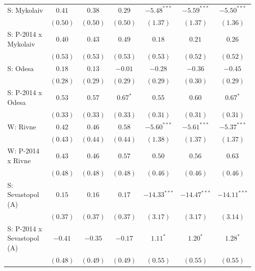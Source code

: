 \begin{table}
\begin{center}
\begin{small}
\begin{tabular}{l c c c c c c}
S: Mykolaiv                 & $0.41$        & $0.38$       & $0.29$        & $-5.48^{***}$  & $-5.59^{***}$  & $-5.50^{***}$  \\
                            & $(0.50)$      & $(0.50)$     & $(0.50)$      & $(1.37)$       & $(1.37)$       & $(1.36)$       \\
S: P-2014 x Mykolaiv        & $0.40$        & $0.43$       & $0.49$        & $0.18$         & $0.21$         & $0.26$         \\
                            & $(0.53)$      & $(0.53)$     & $(0.53)$      & $(0.53)$       & $(0.52)$       & $(0.52)$       \\
S: Odesa                    & $0.18$        & $0.13$       & $-0.01$       & $-0.28$        & $-0.36$        & $-0.45$        \\
                            & $(0.28)$      & $(0.29)$     & $(0.29)$      & $(0.29)$       & $(0.30)$       & $(0.29)$       \\
S: P-2014 x Odesa           & $0.53$        & $0.57$       & $0.67^{*}$    & $0.55$         & $0.60$         & $0.67^{*}$     \\
                            & $(0.33)$      & $(0.33)$     & $(0.33)$      & $(0.31)$       & $(0.31)$       & $(0.31)$       \\
W: Rivne                    & $0.42$        & $0.46$       & $0.58$        & $-5.60^{***}$  & $-5.61^{***}$  & $-5.37^{***}$  \\
                            & $(0.43)$      & $(0.44)$     & $(0.44)$      & $(1.38)$       & $(1.37)$       & $(1.37)$       \\
W: P-2014 x Rivne           & $0.43$        & $0.46$       & $0.57$        & $0.50$         & $0.56$         & $0.63$         \\
                            & $(0.48)$      & $(0.48)$     & $(0.48)$      & $(0.46)$       & $(0.46)$       & $(0.46)$       \\
S: Sevastopol (A)           & $0.15$        & $0.16$       & $0.17$        & $-14.33^{***}$ & $-14.47^{***}$ & $-14.11^{***}$ \\
                            & $(0.37)$      & $(0.37)$     & $(0.37)$      & $(3.17)$       & $(3.17)$       & $(3.14)$       \\
S: P-2014 x Sevastopol (A)  & $-0.41$       & $-0.35$      & $-0.17$       & $1.11^{*}$     & $1.20^{*}$     & $1.28^{*}$     \\
                            & $(0.48)$      & $(0.49)$     & $(0.49)$      & $(0.55)$       & $(0.55)$       & $(0.55)$       \\

\end{tabular}
\end{small}
\end{center}
\end{table}
